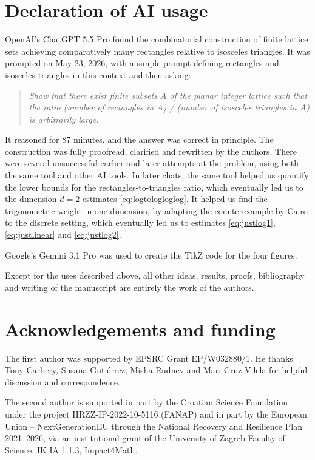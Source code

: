 \documentclass[11pt,reqno]{amsart}
\numberwithin{equation}{section}
\begin{document}

\section*{Declaration of AI usage}
OpenAI's ChatGPT 5.5 Pro found the combinatorial construction of finite lattice sets achieving comparatively many rectangles relative to isosceles triangles. It was prompted on May 23, 2026, with a simple prompt defining rectangles and isosceles triangles in this context and then asking:
\begin{quote}
\emph{Show that there exist finite subsets $A$ of the planar integer lattice such that the ratio (number of rectangles in $A$) / (number of isosceles triangles in $A$) is arbitrarily large.}
\end{quote}
It reasoned for $87$ minutes, and the answer was correct in principle. The construction was fully proofread, clarified and rewritten by the authors. There were several unsuccessful earlier and later attempts at the problem, using both the same tool and other AI tools. 
In later chats, the same tool helped us quantify the lower bounds for the rectangles-to-triangles ratio, which eventually led us to the dimension $d=2$ estimates \eqref{eq:logtologloglog}.
It helped us find the trigonometric weight in one dimension, by adapting the counterexample by Cairo \cite{Cairo} to the discrete setting, which eventually led us to estimates \eqref{eq:justlog1}, \eqref{eq:justlinear} and \eqref{eq:justlog2}.

Google's Gemini 3.1 Pro was used to create the TikZ code for the four figures.

Except for the uses described above, all other ideas, results, proofs, bibliography and writing of the manuscript are entirely the work of the authors.


\section*{Acknowledgements and funding}
The first author was supported by EPSRC Grant EP/W032880/1. He thanks Tony Carbery, Susana Guti\'errez, Misha Rudnev and Mari Cruz Vilela for helpful discussion and correspondence.

The second author is supported in part by the Croatian Science Foundation under the project HRZZ-IP-2022-10-5116 (FANAP) and in part by the European Union -- NextGenerationEU through the National Recovery and Resilience Plan 2021--2026, via an institutional grant of the University of Zagreb Faculty of Science, IK IA 1.1.3, Impact4Math.
\end{document}
